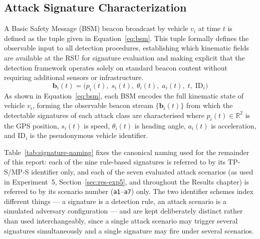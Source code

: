 \documentclass[12pt, a4paper]{report}
\begin{document}
\subsection{Attack Signature Characterization}
\label{sec:attack_signatures}

A Basic Safety Message (BSM) beacon broadcast by vehicle
$v_i$ at time $t$ is defined as the tuple given in
Equation~\ref{eq:bsm}. This tuple formally defines the observable input to all detection
procedures, establishing which kinematic fields are available at the
RSU for signature evaluation and making explicit that the detection
framework operates solely on standard beacon content
without requiring additional sensors or infrastructure.
\begin{equation}
  \mathbf{b}_i(t) = \bigl(p_i(t),\; s_i(t),\; \theta_i(t),\;
                    a_i(t),\; t,\; \mathrm{ID}_i\bigr)
  \label{eq:bsm}
\end{equation}
As shown in
Equation~\ref{eq:bsm}, each BSM encodes the full kinematic state of
vehicle $v_i$, forming the observable beacon stream
$\{\mathbf{b}_i(t)\}$ from which the detectable signatures of each
attack class are characterised where $p_i(t) \in \mathbb{R}^2$ is the GPS position, $s_i(t)$ is speed,
$\theta_i(t)$ is heading angle, $a_i(t)$ is acceleration, and
$\mathrm{ID}_i$ is the pseudonymous vehicle identifier.

Table~\ref{tab:signature-naming} fixes the canonical naming used for
the remainder of this report: each of the nine rule-based signatures
is referred to by its TP-S/MP-S identifier only, and each of the seven
evaluated attack scenarios (as used in Experiment~5,
Section~\ref{sec:res-exp5}, and throughout the Results chapter) is
referred to by its scenario number (\texttt{a1}--\texttt{a7}) only. The two identifier
schemes index different things --- a signature is a detection rule,
an attack scenario is a simulated adversary configuration --- and are
kept deliberately distinct rather than used interchangeably, since a
single attack scenario may trigger several signatures simultaneously
and a single signature may fire under several scenarios.
\end{document}

